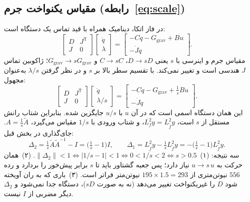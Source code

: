 \documentclass[10pt,twocolumn]{article}
\newcommand{\en}[1]{\lr{#1}}
\begin{document}
\subsection{مقیاس یکنواخت جرم (رابطه~\eqref{eq:scale})}
در فاز اتکا، دینامیک همراه با قید تماس یک دستگاه \en{KKT} است:
\begin{equation*}
    \begin{bmatrix}D & J^{\mathsf T}\\ J & 0\end{bmatrix}
    \begin{bmatrix}\ddot q\\ \lambda\end{bmatrix}
    =\begin{bmatrix}-C\dot q-G_{\mathrm{grav}}+Bu\\ -\dot J\dot q\end{bmatrix}.
\end{equation*}
مقیاس جرم و اینرسی با $s$ یعنی $D\to sD$، $C\to sC$ و
$G_{\mathrm{grav}}\to sG_{\mathrm{grav}}$؛ ژاکوبین تماس $J$ هندسی است و تغییر نمی‌کند.
با تقسیم سطر بالا بر $s$ و در نظر گرفتن $\lambda/s$ به‌عنوان مجهول:
\begin{equation*}
    \begin{bmatrix}D & J^{\mathsf T}\\ J & 0\end{bmatrix}
    \begin{bmatrix}\ddot q\\ \lambda/s\end{bmatrix}
    =\begin{bmatrix}-C\dot q-G_{\mathrm{grav}}+\tfrac1s Bu\\ -\dot J\dot q\end{bmatrix}.
\end{equation*}
این همان دستگاه اسمی است که در آن $u$ با $u/s$ جایگزین شده. بنابراین شتاب رانش مستقل
از $s$ است، $L_f^2y=L_{\tilde f}^2y$، و شتاب ورودی با $1/s$ مقیاس می‌گیرد،
$A=\tfrac1s\tilde A$. جای‌گذاری در بخش قبل:
\begin{equation*}
    \Delta_2=\tfrac1s\tilde A\tilde A^{-1}-I=\Big(\tfrac1s-1\Big)I,\qquad
    \Delta_1=L_{\tilde f}^2y-\tfrac1s L_{\tilde f}^2y=-\Big(\tfrac1s-1\Big)L_{\tilde f}^2y .
\end{equation*}
سه نتیجه: (۱)~$\|\Delta_2\|<1\iff|1/s-1|<1\iff 0<1/s<2\iff s>0.5$.
(۲)~همان حرکت به $u\to s\,u$ نیاز دارد؛ پس جعبه گشتاور باید تا $s$ برابر پیش‌خور را
بردارد و رده $556$ نیوتن‌متری از $195\times1.5=293$ نیوتن‌متر فراتر است.
(۳)~باری که به ران آویخته شود $D$ را غیریکنواخت تغییر می‌دهد (نه به صورت $sD$)،
دستگاه جدا نمی‌شود و $\Delta_2$ دیگر مضربی از $I$ نیست.
\end{document}
